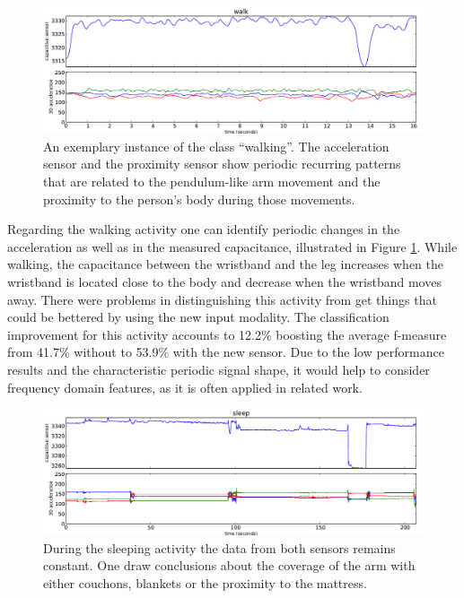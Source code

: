 \documentclass[runningheads,a4paper]{llncs}
\begin{document}
\begin{figure}
	\centering
		\includegraphics[width=1.00\textwidth]{../Auswertung/images/marko_8.pdf}
	\caption{An exemplary instance of the class ``walking''. The acceleration sensor and the proximity sensor show periodic recurring patterns that are related to the pendulum-like arm movement and the proximity to the person's body during those movements.}
	\label{fig:walking}
\end{figure}

Regarding the walking activity one can identify periodic changes in the acceleration as well as in the measured capacitance, illustrated in Figure \ref{fig:walking}. While walking, the capacitance between the wristband and the leg increases when the wristband is located close to the body and decrease when the wristband moves away. There were problems in distinguishing this activity from get things that could be bettered by using the new input modality. The classification improvement for this activity accounts to 12.2\% boosting the average f-measure from 41.7\% without to 53.9\% with the new sensor. Due to the low performance results and the characteristic periodic signal shape, it would help to consider frequency domain features, as it is often applied in related work.

\begin{figure}
	\centering
		\includegraphics[width=1.00\textwidth]{../Auswertung/images/eugen_9.pdf}
	\caption{During the sleeping activity the data from both sensors remains constant. One draw conclusions about the coverage of the arm with either couchons, blankets or the proximity to the mattress.}
	\label{fig:sleeping}
\end{figure}
\end{document}
